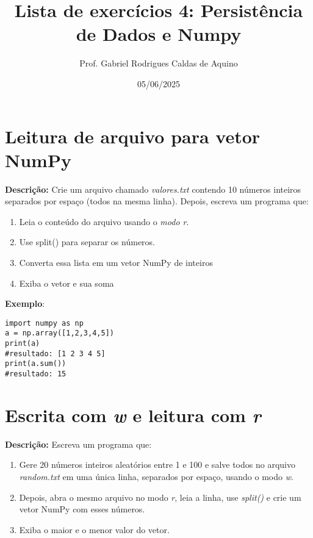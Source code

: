 \title{Lista de exercícios 4: Persistência de Dados e Numpy}
\author{Prof. Gabriel Rodrigues Caldas de Aquino}
\date{05/06/2025}



\maketitle

\section{Leitura de arquivo para vetor NumPy}

\textbf{Descrição:} Crie um arquivo chamado \textit{valores.txt} contendo 10 números inteiros separados por espaço (todos na mesma linha). Depois, escreva um programa que:
\begin{enumerate}
    \item Leia o conteúdo do arquivo usando o \textit{modo r}.
    \item Use split() para separar os números.
    \item Converta essa lista em um vetor NumPy de inteiros
    \item Exiba o vetor e sua soma
\end{enumerate}

\textbf{Exemplo}:
\begin{verbatim}
import numpy as np
a = np.array([1,2,3,4,5])
print(a)
#resultado: [1 2 3 4 5]
print(a.sum())
#resultado: 15
\end{verbatim}

\section{Escrita com \textit{w} e leitura com \textit{r}}

\textbf{Descrição:} Escreva um programa que:

\begin{enumerate}
    \item Gere 20 números inteiros aleatórios entre 1 e 100 e salve todos no arquivo \textit{random.txt} em uma única linha, separados por espaço, usando o modo \textit{w}.
    \item Depois, abra o mesmo arquivo no modo \textit{r}, leia a linha, use \textit{split()} e crie um vetor NumPy com esses números.
    \item Exiba o maior e o menor valor do vetor.
\end{enumerate}

